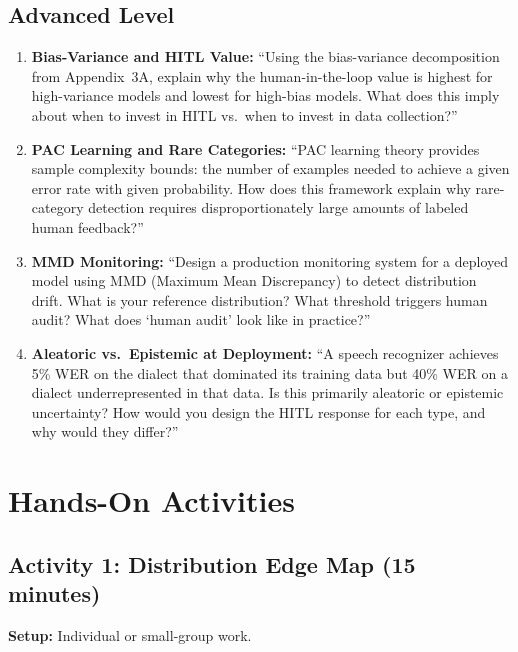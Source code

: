 \subsection{Advanced Level}

\begin{enumerate}
    \item \textbf{Bias-Variance and HITL Value:} ``Using the bias-variance decomposition from Appendix~3A, explain why the human-in-the-loop value is highest for high-variance models and lowest for high-bias models. What does this imply about when to invest in HITL vs.\ when to invest in data collection?''

    \item \textbf{PAC Learning and Rare Categories:} ``PAC learning theory provides sample complexity bounds: the number of examples needed to achieve a given error rate with given probability. How does this framework explain why rare-category detection requires disproportionately large amounts of labeled human feedback?''

    \item \textbf{MMD Monitoring:} ``Design a production monitoring system for a deployed model using MMD (Maximum Mean Discrepancy) to detect distribution drift. What is your reference distribution? What threshold triggers human audit? What does `human audit' look like in practice?''

    \item \textbf{Aleatoric vs.\ Epistemic at Deployment:} ``A speech recognizer achieves 5\% WER on the dialect that dominated its training data but 40\% WER on a dialect underrepresented in that data. Is this primarily aleatoric or epistemic uncertainty? How would you design the HITL response for each type, and why would they differ?''
\end{enumerate}

\section{Hands-On Activities}

\subsection{Activity 1: Distribution Edge Map (15 minutes)}

\textbf{Setup:} Individual or small-group work.

